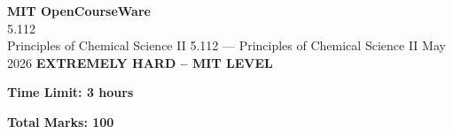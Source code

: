 \documentclass[12pt,a4paper]{exam}
\begin{document}
\begin{center}
{\LARGE \textbf{MIT OpenCourseWare}}\\5.112\\Principles of Chemical Science II
\vspace{0.5cm}
{5.112} --- {Principles of Chemical Science II}
\vspace{0.3cm}
May 2026
\vspace{0.3cm}
\textbf{EXTREMELY HARD -- MIT LEVEL}
\end{center}

\begin{center}
\textbf{Time Limit: 3 hours}
\end{center}

\begin{center}
\textbf{Total Marks: 100}
\end{center}

\vspace{0.5cm}
\end{document}
